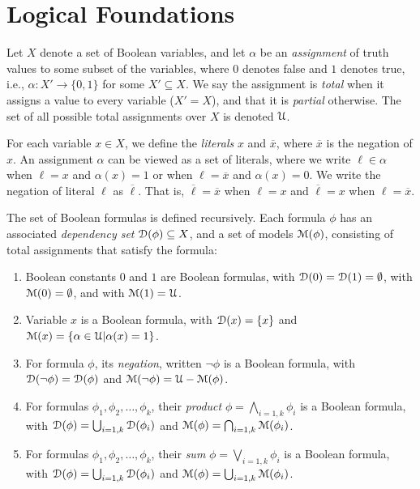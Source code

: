 \documentclass[letterpaper,USenglish,cleveref, autoref, thm-restate]{lipics-v2021}
\newcommand{\boolnot}{\neg}
\newcommand{\obar}[1]{\overline{#1}}
\newcommand{\lit}{\ell}
\newcommand{\varset}{X}
\newcommand{\dependencyset}{{\cal D}}
\newcommand{\assign}{\alpha}
\newcommand{\uassign}{{\cal U}}
\newcommand{\modelset}{{\cal M}}
\begin{document}
\section{Logical Foundations}

  Let $\varset$ denote a set of Boolean variables, and let $\assign$
  be an {\em assignment} of truth values to some subset of the
  variables, where $0$ denotes false and $1$ denotes true, i.e.,
  $\assign \colon \varset' \rightarrow \{0,1\}$ for some $\varset'
  \subseteq \varset$.  We say the assignment is {\em total} when it
  assigns a value to every variable ($\varset' = \varset$), and that
  it is {\em partial} otherwise.
  The set of all possible total assignments over
  $\varset$ is denoted $\uassign$.

For each variable $x \in \varset$,
  we define the {\em literals} $x$ and $\obar{x}$, where $\obar{x}$ is the
  negation of $x$. An
  assignment $\assign$ can be viewed as a set of literals, where
  we write $\lit \in \assign$ when $\lit = x$ and $\assign(x) = 1$ or when
  $\lit = \obar{x}$ and $\assign(x) = 0$.  We write the negation of literal $\lit$ as $\obar{\lit}$.  That is, $\obar{\lit} = \obar{x}$ when $\lit = x$ and
$\obar{\lit} = x$ when $\lit = \obar{x}$.


\begin{definition}
  The set of Boolean formulas is defined recursively.  Each
  formula $\phi$ has an associated {\em dependency set}
  $\dependencyset(\phi)  \subseteq \varset$, and a set of models $\modelset(\phi)$,
  consisting of total assignments that satisfy the formula:
  \begin{enumerate}
  \item Boolean constants $0$ and $1$ are Boolean formulas,
    with $\dependencyset(0) = \dependencyset(1) = \emptyset$, with $\modelset(0) = \emptyset$, and with $\modelset(1) = \uassign$.
  \item Variable $x$ is a Boolean formula, with $\dependencyset(x) = \{x\}$
    and $\modelset(x) = \{\assign \in \uassign | \assign(x)=1\}$.
  \item For formula $\phi$, its {\em negation}, written $\boolnot \phi$ is a Boolean formula,
    with $\dependencyset(\boolnot \phi) = \dependencyset(\phi)$ and $\modelset(\boolnot \phi) = \uassign - \modelset(\phi)$.
  \item For formulas $\phi_1, \phi_2, \ldots, \phi_k$, their {\em product} $\phi = \bigwedge_{i=1,k} \phi_i$ is a Boolean formula, with
      $\dependencyset(\phi) = \bigcup_{i=1,k} \dependencyset(\phi_i)$ and
      $\modelset(\phi) = \bigcap_{i=1,k} \modelset(\phi_i)$.
  \item For formulas $\phi_1, \phi_2, \ldots, \phi_k$, their {\em sum} $\phi = \bigvee_{i=1,k} \phi_i$ is a Boolean formula, with
      $\dependencyset(\phi) = \bigcup_{i=1,k} \dependencyset(\phi_i)$ and
      $\modelset(\phi) = \bigcup_{i=1,k} \modelset(\phi_i)$.
  \end{enumerate}
\label{def:boolean}
\end{definition}
\end{document}
